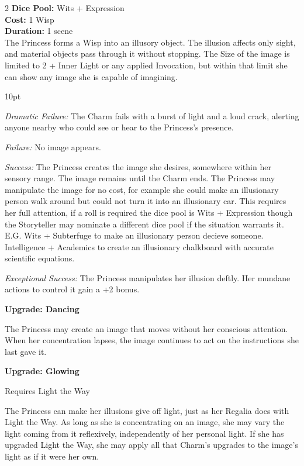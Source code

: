 \begin{multicols}{2}
\noindent \textbf{Dice Pool:} Wits + Expression \\

\noindent \textbf{Cost:} 1 Wisp\\

\noindent \textbf{Duration:} 1 scene\\

\noindent The Princess forms a Wisp into an illusory object. The illusion affects only sight, and material objects pass through it without stopping. The Size of the image is limited to 2 + Inner Light or any applied Invocation, but within that limit she can show any image she is capable of imagining.

\begin{myindentpar}{10pt}

\emph{Dramatic Failure:} The Charm fails with a burst of light and a loud crack, alerting anyone nearby who could see or hear to the Princess's presence.

\emph{Failure:} No image appears.

\emph{Success:} The Princess creates the image she desires, somewhere within her sensory range. The image remains until the Charm ends. The Princess may manipulate the image for no cost, for example she could make an illusionary person walk around but could not turn it into an illusionary car. This requires her full attention, if a roll is required the dice pool is Wits + Expression though the Storyteller may nominate a different dice pool if the situation warrants it. E.G. Wits + Subterfuge to make an illusionary person decieve someone. Intelligence + Academics to create an illusionary chalkboard with accurate scientific equations. 

\emph{Exceptional Success:} The Princess manipulates her illusion deftly. Her mundane actions to control it gain a +2 bonus.

\textbf{Upgrade: Dancing}

The Princess may create an image that moves without her conscious attention. When her concentration lapses, the image continues to act on the instructions she last gave it.

\textbf{Upgrade: Glowing}

Requires Light the Way

The Princess can make her illusions give off light, just as her Regalia does with Light the Way. As long as she is concentrating on an image, she may vary the light coming from it reflexively, independently of her personal light. If she has upgraded Light the Way, she may apply all that Charm’s upgrades to the image’s light as if it were her own.


\end{myindentpar}
\end{multicols}
